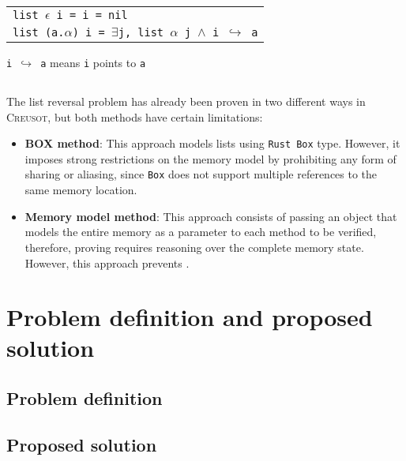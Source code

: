 \documentclass[12pt,a4paper]{report}
\begin{document}
\begin{center}
\begin{tabular}{l}
\texttt{list $\epsilon$ i = i = nil} \\
\texttt{list (a.$\alpha$) i = $\exists$j, list $\alpha$ j $\land$ i $\hookrightarrow$ a}
\end{tabular}
\end{center}
\texttt{i $\hookrightarrow$ a} means \texttt{i} points to \texttt{a}

\section{}
The list reversal problem has already been proven in two different ways in \textsc{Creusot}, but both methods have certain limitations:

\begin{itemize}
\item \textbf{\textsc{BOX} method}: This approach models lists using \texttt{Rust Box} type. However, it imposes strong restrictions on the memory model by prohibiting any form of sharing or aliasing, since \texttt{Box} does not support multiple references to the same memory location.
\item \textbf{Memory model method}: This approach consists of passing an object that models the entire memory as a parameter to each method to be verified, therefore, proving requires reasoning over the complete memory state. However, this approach prevents .
\end{itemize}

\chapter{Problem definition and proposed solution}

\section{Problem definition}
\section{Proposed solution}
\end{document}
